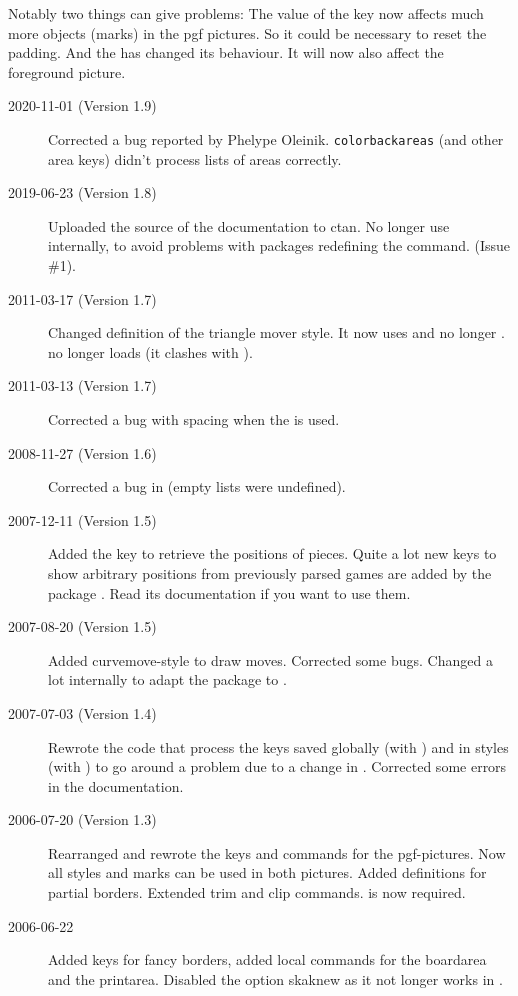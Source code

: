 \documentclass[pagesize,parskip=half-,fontsize=12pt]{scrartcl}
\begin{document}
Notably two things can give problems: The value of the
 key now affects much more objects (marks) in the pgf
pictures. So it could be necessary to reset the padding. And the
 has changed its behaviour. It will now also affect
the foreground picture.

\begin{description}
\item[2020-11-01 (Version 1.9)] Corrected a bug reported by 
  Phelype Oleinik. \texttt{colorbackareas} (and other area keys) didn't process lists of areas correctly.

\item[2019-06-23 (Version 1.8)] Uploaded the source of the documentation to ctan.
  No longer use  internally, to avoid problems with packages redefining the command. (Issue \#1).

\item[2011-03-17 (Version 1.7)] Changed definition of the triangle mover
    style. It now uses  and no longer
    .  no longer loads
     (it clashes with ).

\item[2011-03-13 (Version 1.7)] Corrected a bug with spacing when the
     is used.


\item[2008-11-27 (Version 1.6)] Corrected a bug in 
(empty lists were undefined).


\item[2007-12-11 (Version 1.5)] Added the key  to
retrieve the positions of pieces. Quite a lot new keys to show
arbitrary positions from previously parsed games are added by the
package . Read its documentation if you want to
use them.

\item[2007-08-20 (Version 1.5)] Added curvemove-style to draw moves.
Corrected some bugs. Changed a lot internally to adapt the package to
.

\item[2007-07-03 (Version 1.4)] Rewrote the code that process the
keys saved globally (with ) and  in styles (with
) to go around a problem due to a change in
. Corrected some errors in the
documentation.
\item[2006-07-20 (Version 1.3)] Rearranged and rewrote the keys and commands for
the pgf-pictures. Now all styles and marks can be used in both
pictures. Added definitions for partial borders. Extended trim and
clip commands.  is now required.
\item[2006-06-22] Added keys for fancy borders, added local commands for
the boardarea and the printarea. Disabled the option skaknew as it
not longer works in \chessfss.
\end{description}
\end{document}
